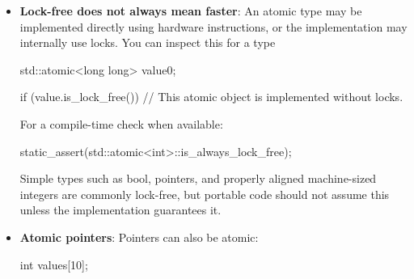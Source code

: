 \documentclass{report}
\begin{document}
\begin{itemize}
\begin{cppcode}
                void transfer() {
                    account_a.fetch_sub(50);
                    account_b.fetch_add(50);
                }
            \end{cppcode}
            \bigbreak \noindent 
            Each operation is atomic, but the complete transfer is not. Another thread could observe:
            \bigbreak \noindent 
            \begin{cppcode}
                account_a == 50
                account_b == 100
            \end{cppcode}
            \bigbreak \noindent 
            If both values must change as one transaction, use a mutex:
            \bigbreak \noindent 
            \begin{cppcode}
                #include <mutex>

                int account_a = 100;
                int account_b = 100;
                std::mutex accounts_mutex;

                void transfer() {
                    std::lock_guard lock(accounts_mutex);

                    account_a -= 50;
                    account_b += 50;
                }
            \end{cppcode}
            \bigbreak \noindent 
            Atomics protect individual atomic operations. They do not automatically protect larger invariants involving several operations or objects.
        \item \textbf{Lock-free does not always mean faster}: An atomic type may be implemented directly using hardware instructions, or the implementation may internally use locks.
            \bigbreak \noindent 
            You can inspect this for a type
            \bigbreak \noindent 
            \begin{cppcode}
                std::atomic<long long> value{0};

                if (value.is_lock_free()) {
                    // This atomic object is implemented without locks.
                }
            \end{cppcode}
            \bigbreak \noindent 
            For a compile-time check when available:
            \bigbreak \noindent 
            \begin{cppcode}
            static_assert(std::atomic<int>::is_always_lock_free);
            \end{cppcode}
            \bigbreak \noindent 
            Simple types such as bool, pointers, and properly aligned machine-sized integers are commonly lock-free, but portable code should not assume this unless the implementation guarantees it.
        \item \textbf{Atomic pointers}: Pointers can also be atomic:
            \bigbreak \noindent 
            \begin{cppcode}
                int values[10];


\end{cppcode}
\end{itemize}
\end{document}
